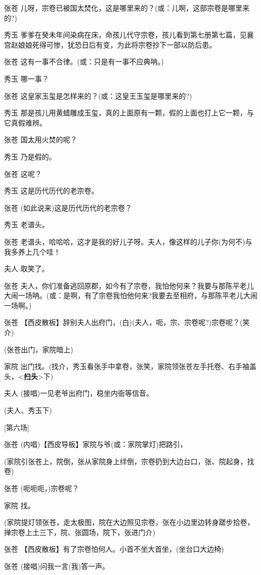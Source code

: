 张苍
儿呀，宗卷已被国太焚化，这是哪里来的？(或：儿啊，这部宗卷是哪里来的?)

秀玉
爹爹在癸未年间染病在床，命孩儿代守宗卷，孩儿看到第七册第七篇，见襄宫赵娘娘死得可惨，犹恐日后有变，为此将宗卷抄下一部以防后患。

张苍 这有一事不合律。(或：只是有一事不应典呐。)

秀玉 哪一事？

张苍 这皇家玉玺是怎样来的？(或：这皇王玉玺是哪里来的?)

秀玉
那是孩儿用黄蜡雕成玉玺，真的上面原有一颗，假的上面也打上它一颗，与它真假难辨。

张苍 国太用火焚的呢？

秀玉 乃是假的。

张苍 这呢？

秀玉 这是历代历代的老宗卷。

张苍 (如此说来)这是历代历代的老宗卷？

秀玉 老谱头。

张苍
老谱头，哈哈哈，这才是我的好儿子呀。夫人，像这样的儿子你(为何不)与我多养上几个哇！

夫人 取笑了。

张苍
夫人，你们准备逃回原郡，如今有了宗卷，我怕他何来？我要与那陈平老儿大闹一场呐。(或：是啊，有了宗卷我怕他何来?我要去至相府，与那陈平老儿大闹一场啊。)

张苍
【西皮散板】辞别夫人出府门，(白)(夫人，呃，宗、宗卷呢?)宗卷呢？(笑介)

(张苍出门，家院暗上)

家院
出门找。(找介，秀玉看张手中拿卷，张笑，家院领张苍左手托卷、右手袖盖头，\textless{}\textbf{扫头}\textgreater{}下)

夫人 (接唱)一见老爷出府门，稳坐内衙等信音。

(夫人、秀玉下)

{[}第六场{]}

张苍 (内唱)【西皮导板】家院与爷(或：家院掌灯)把路引，

(家院引张苍上，院倒，张从家院身上绊倒，宗卷扔到大边台口，张、院起身，找卷)

张苍 (呃呃呃，)宗卷呢？

家院 找。

(家院提灯领张苍，走太极图，院在大边照见宗卷，张在小边里边转身蹉步拾卷，掸宗卷上土三下，院、张圆场，院下，张进门介)

张苍 【西皮散板】有了宗卷怕何人。小首不坐大首坐，(坐台口大边椅)

张苍 (接唱)问我一言(我)答一声。

